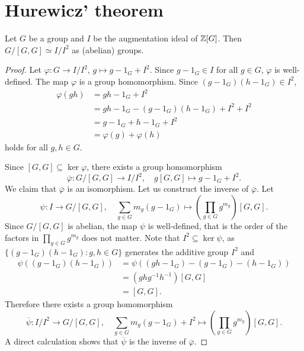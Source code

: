 \section{Hurewicz' theorem}

\begin{theorem}[Hurewicz]
    \label{thm:Hurewicz}
    Let $G$ be a group and $I$ be the augmentation ideal of $\mathbb{Z}[G]$. 
    Then $G/[G,G]\simeq I/I^2$ as (abelian) groups. 
\end{theorem}

\begin{proof}
    Let $\varphi\colon G\to I/I^2$, $g\mapsto g-1_G+I^2$. Since $g-1_G\in I$ for all $g\in G$, $\varphi$ is well-defined. The map $\varphi$ is a group homomorphism. Since 
    $(g-1_G)(h-1_G)\in I^2$, 
    \begin{align*}
    \varphi(gh) &= gh-1_G+I^2\\
    &=gh-1_G-(g-1_G)(h-1_G)+I^2+I^2\\
    &=g-1_G+h-1_G+I^2\\
    &=\varphi(g)+\varphi(h)
    \end{align*}
    holds for all $g,h\in G$. 

    Since $[G,G]\subseteq\ker\varphi$, there exists a group homomorphism
    \[
    \overline{\varphi}\colon G/[G,G]\to I/I^2,\quad 
    g[G,G]\mapsto g-1_G+I^2.
    \]
    We claim that $\overline{\varphi}$ is an isomorphism. 
    Let us construct the inverse of $\overline{\varphi}$. Let 
    \[
    \psi\colon I\to G/[G,G],\quad 
    \sum_{g\in G}m_g(g-1_G)\mapsto \left(\prod_{g\in G}g^{m_g}\right)[G,G].
    \]
    Since $G/[G,G]$ is abelian, the map $\psi$ is well-defined, that is
    the order of the factors in $\prod_{g\in G}g^{m_g}$ does not matter. Note that 
    $I^2\subseteq\ker\psi$, as 
    $\{(g-1_G)(h-1_G):g,h\in G\}$ generates the additive group $I^2$ 
    and 
    \begin{align*}
        \psi((g-1_G)(h-1_G))&=\psi( (gh-1_G)-(g-1_G)-(h-1_G))\\
        &=(ghg^{-1}h^{-1})[G,G]\\
        &=[G,G].
    \end{align*}
    Therefore there exists a group homomorphism
    \[
    \overline{\psi}\colon I/I^2\to G/[G,G],\quad 
    \sum_{g\in G}m_g(g-1_G)+I^2\mapsto \left(\prod_{g\in G}g^{m_g}\right)[G,G].
    \]
    A direct calculation shows that $\overline{\psi}$ is the inverse 
    of $\overline{\varphi}$. 
\end{proof}

